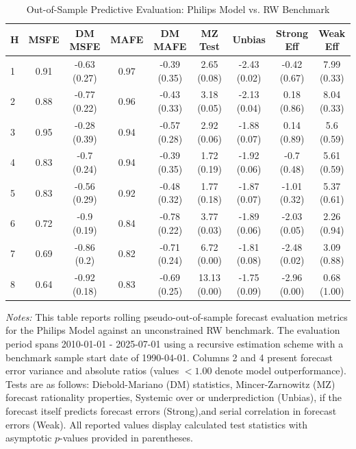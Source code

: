 \begin{table}[htbp]
\centering
\caption{Out-of-Sample Predictive Evaluation: Philips Model vs. RW Benchmark}
\label{tab:philips_model_evaluation}
\footnotesize
\begin{tabular}{l cccccccc}
\hline\hline
\rule{0pt}{3ex}
\textbf{H} & \textbf{MSFE} & \textbf{DM MSFE} & \textbf{MAFE} & \textbf{DM MAFE} & \textbf{MZ Test} & \textbf{Unbias} & \textbf{Strong Eff} & \textbf{Weak Eff} \\[0.5ex]
\hline
\rule{0pt}{2.5ex}
1 & 0.91 & -0.63 (0.27) & 0.97 & -0.39 (0.35) & 2.65 (0.08) & -2.43 (0.02) & -0.42 (0.67) & 7.99 (0.33) \\
2 & 0.88 & -0.77 (0.22) & 0.96 & -0.43 (0.33) & 3.18 (0.05) & -2.13 (0.04) & 0.18 (0.86) & 8.04 (0.33) \\
3 & 0.95 & -0.28 (0.39) & 0.94 & -0.57 (0.28) & 2.92 (0.06) & -1.88 (0.07) & 0.14 (0.89) & 5.6 (0.59) \\
4 & 0.83 & -0.7 (0.24) & 0.94 & -0.39 (0.35) & 1.72 (0.19) & -1.92 (0.06) & -0.7 (0.48) & 5.61 (0.59) \\
5 & 0.83 & -0.56 (0.29) & 0.92 & -0.48 (0.32) & 1.77 (0.18) & -1.87 (0.07) & -1.01 (0.32) & 5.37 (0.61) \\
6 & 0.72 & -0.9 (0.19) & 0.84 & -0.78 (0.22) & 3.77 (0.03) & -1.89 (0.06) & -2.03 (0.05) & 2.26 (0.94) \\
7 & 0.69 & -0.86 (0.2) & 0.82 & -0.71 (0.24) & 6.72 (0.00) & -1.81 (0.08) & -2.48 (0.02) & 3.09 (0.88) \\
8 & 0.64 & -0.92 (0.18) & 0.83 & -0.69 (0.25) & 13.13 (0.00) & -1.75 (0.09) & -2.96 (0.00) & 0.68 (1.00) \\
\hline\hline
\end{tabular}%
\par\smallskip
\parbox{\textwidth}{\scriptsize \textit{Notes:} This table reports rolling pseudo-out-of-sample forecast evaluation metrics for the Philips Model against an unconstrained RW benchmark. The evaluation period spans 2010-01-01 - 2025-07-01 using a recursive estimation scheme with a benchmark sample start date of 1990-04-01. Columns 2 and 4 present forecast error variance and absolute ratios (values $< 1.00$ denote model outperformance). Tests are as follows: Diebold-Mariano (DM) statistics, Mincer-Zarnowitz (MZ) forecast rationality properties, Systemic over or underprediction (Unbias), if the forecast itself predicts forecast errors (Strong),and serial correlation in forecast errors (Weak). All reported values display calculated test statistics with asymptotic $p$-values provided in parentheses.}
\end{table}
